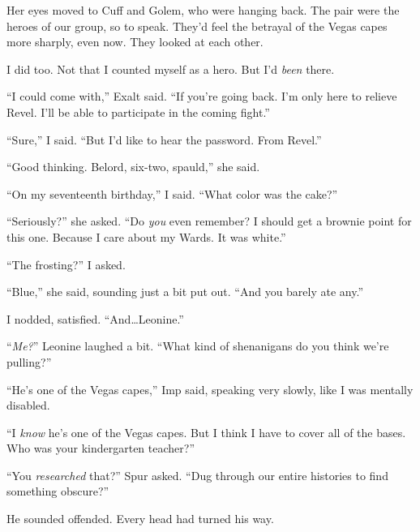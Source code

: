 Her eyes moved to Cuff and Golem, who were hanging back.  The pair were the heroes of our group, so to speak.  They'd feel the betrayal of the Vegas capes more sharply, even now.  They looked at each other.



I did too.  Not that I counted myself as a hero.  But I'd \emph{been} there.



``I could come with,'' Exalt said.  ``If you're going back.  I'm only here to relieve Revel.  I'll be able to participate in the coming fight.''



``Sure,'' I said.  ``But I'd like to hear the password.  From Revel.''



``Good thinking.  Belord, six-two, spauld,'' she said.



``On my seventeenth birthday,'' I said.  ``What color was the cake?''



``Seriously?'' she asked.  ``Do \emph{you} even remember?  I should get a brownie point for this one.  Because I care about my Wards.  It was white.''



``The frosting?'' I asked.



``Blue,'' she said, sounding just a bit put out.  ``And you barely ate any.''



I nodded, satisfied.  ``And\ldots Leonine.''



``\emph{Me?}''  Leonine laughed a bit.  ``What kind of shenanigans do you think we're pulling?''



``He's one of the Vegas capes,'' Imp said, speaking very slowly, like I was mentally disabled.



``I \emph{know} he's one of the Vegas capes.  But I think I have to cover all of the bases.  Who was your kindergarten teacher?''



``You \emph{researched} that?'' Spur asked.  ``Dug through our entire histories to find something obscure?''



He sounded offended.  Every head had turned his way.



